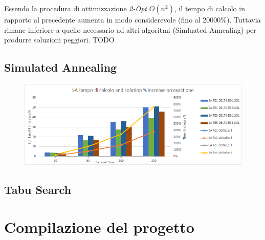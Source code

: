      Essendo la procedura di ottimizzazione \textit{2-Opt} $O(n^{2}) $, il tempo di calcolo in rapporto al precedente aumenta in modo considerevole (fino al 20000\%). Tuttavia rimane inferiore a quello necessario ad altri algoritmi (Simluated Annealing) per produrre soluzioni peggiori. TODO
     
	 \subsection{Simulated Annealing}
	 \begin{figure}[h!]
	 	\centering
	 	\includegraphics[width=0.7\linewidth]{img/SASolAndTimeIncrease}
	 	\caption{}
	 	\label{fig:sasolandtimeincrease}
	 \end{figure}
	 
	 \subsection{Tabu Search} 
	
	\section{Compilazione del progetto}
	
	\appendix
	

